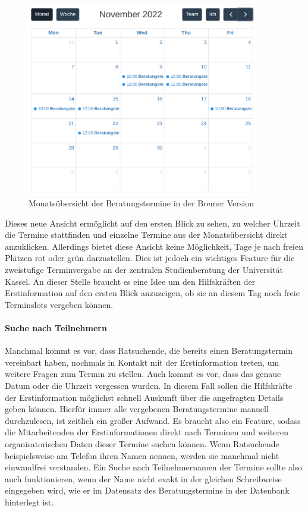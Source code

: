 \documentclass[12pt]{article}
\begin{document}
\begin{figure}[h]
    \caption{Monatsübersicht der Beratungstermine in der Bremer Version}
    \centering
    \includegraphics[width=0.9\textwidth]{screen_bremen_month_view.png}
\end{figure}

Dieses neue Ansicht ermöglicht auf den ersten Blick zu sehen, zu welcher
Uhrzeit die Termine stattfinden und einzelne Termine aus der Monatsübersicht
direkt anzuklicken. Allerdings bietet diese Ansicht keine Möglichkeit, Tage je
nach freien Plätzen rot oder grün darzustellen. Dies ist jedoch ein wichtiges
Feature für die zweistufige Terminvergabe an der zentralen Studienberatung der
Universität Kassel. An dieser Stelle braucht es eine Idee um den Hilfskräften
der Erstinformation auf den ersten Blick anzuzeigen, ob sie an diesem Tag noch
freie Terminslots vergeben können.

\paragraph{Suche nach Teilnehmern}
Manchmal kommt es vor, dass Ratsuchende, die bereits einen Beratungstermin
vereinbart haben, nochmals in Kontakt mit der Erstinformation treten, um
weitere Fragen zum Termin zu stellen. Auch kommt es vor, dass das genaue Datum
oder die Uhrzeit vergessen wurden. In diesem Fall sollen die Hilfskräfte der
Erstinformation möglichst schnell Auskunft über die angefragten Details geben
können. Hierfür immer alle vergebenen Beratungstermine manuell durchzulesen,
ist zeitlich ein großer Aufwand. Es braucht also ein Feature, sodass die
Mitarbeitenden der Erstinformationen direkt nach Terminen und weiteren
organisatorischen Daten dieser Termine suchen können. Wenn Ratsuchende
beispielsweise am Telefon ihren Namen nennen, werden sie manchmal nicht
einwandfrei verstanden. Ein Suche nach Teilnehmernamen der Termine sollte also
auch funktionieren, wenn der Name nicht exakt in der gleichen Schreibweise
eingegeben wird, wie er im Datensatz des Beratungstermins in der Datenbank
hinterlegt ist.
\end{document}

